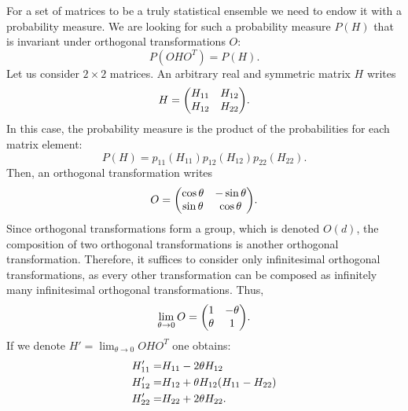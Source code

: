 \documentclass[10pt]{article}
\begin{document}
For a set of matrices to be a truly statistical ensemble we need to endow 
it with a probability measure. We are looking for such a probability measure
$P(H)$ that is invariant under orthogonal transformations $O$:
\begin{equation}
P(O H O^T) = P(H).
\end{equation}
Let us consider $2\times 2$ matrices. An arbitrary real and symmetric matrix 
$H$ writes 
\begin{equation}\label{eq:2by2_matrix}
H = 
\mqty(
H_{11} & H_{12} \\
H_{12} & H_{22}
).
\end{equation}
In this case, the probability measure is the product of the probabilities for
each matrix element:
\begin{equation}
P(H) = p_{11}(H_{11})p_{12}(H_{12})p_{22}(H_{22}).
\end{equation}
Then, an orthogonal transformation writes
\begin{equation*}
O = 
\mqty(
\cos\theta & -\sin\theta \\
\sin\theta & \cos\theta
).
\end{equation*}
Since orthogonal transformations form a group, which is denoted $O(d)$,
the composition of two orthogonal transformations is another orthogonal 
transformation. Therefore, it suffices to consider only infinitesimal 
orthogonal transformations, as every other transformation can be composed 
as infinitely many infinitesimal orthogonal transformations. Thus,
\begin{equation}
\lim_{\theta \to 0} O  = 
\mqty(
1 & -\theta \\
\theta & 1
).
\end{equation}
If we denote $H' = \lim_{\theta \to 0} O H O^T$ one obtains:
\begin{align}
H'_{11} =& H_{11} - 2\theta H_{12} \\
H'_{12} =& H_{12} + \theta H_{12}\qty(H_{11} - H_{22}) \\
H'_{22} =& H_{22} + 2\theta H_{22}.
\end{align}
\end{document}
